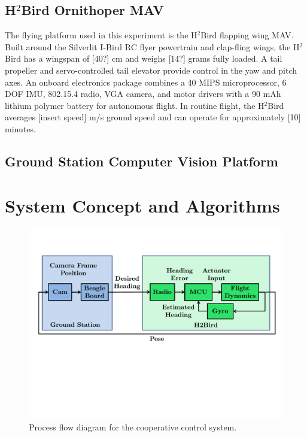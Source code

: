 \documentclass{aamas2013}
\begin{document}
\subsection{H$^2$Bird Ornithoper MAV}
The flying platform used in this experiment is the H$^2$Bird flapping wing 
MAV. Built around the Silverlit I-Bird RC flyer powertrain and clap-fling 
wings, the H$^2$Bird has a wingspan of [40?] cm and weighs [14?] grams 
fully loaded. A tail propeller and servo-controlled tail elevator provide 
control in the yaw and pitch axes. An onboard electronics package combines 
a 40 MIPS microprocessor, 6 DOF IMU, 802.15.4 radio, VGA camera, and motor 
drivers with a 90 mAh lithium polymer battery for autonomous flight. In 
routine flight, the H$^2$Bird averages [insert speed] m/s ground speed and 
can operate for approximately [10] minutes.

\subsection{Ground Station Computer Vision Platform}


\section{System Concept and Algorithms}

\begin{figure}[tb]
\centering
\includegraphics[width=\linewidth]{figures/process_flow.pdf}
\caption{Process flow diagram for the cooperative control system.}
\label{fig:process_flow}
\end{figure}
\end{document}
